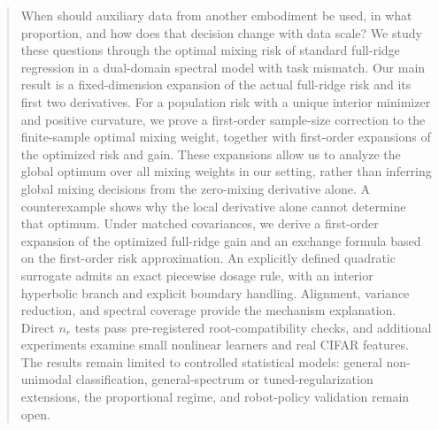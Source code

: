 \begin{abstract}
When should auxiliary data from another embodiment be used, in what proportion, and how does that decision change with data scale? We study these questions through the optimal mixing risk of standard full-ridge regression in a dual-domain spectral model with task mismatch.
Our main result is a fixed-dimension expansion of the actual full-ridge risk and its first two derivatives. For a population risk with a unique interior minimizer and positive curvature, we prove a first-order sample-size correction to the finite-sample optimal mixing weight, together with first-order expansions of the optimized risk and gain. These expansions allow us to analyze the global optimum over all mixing weights in our setting, rather than inferring global mixing decisions from the zero-mixing derivative alone. A counterexample shows why the local derivative alone cannot determine that optimum.
Under matched covariances, we derive a first-order expansion of the optimized full-ridge gain and an exchange formula based on the first-order risk approximation. An explicitly defined quadratic surrogate admits an exact piecewise dosage rule, with an interior hyperbolic branch and explicit boundary handling. Alignment, variance reduction, and spectral coverage provide the mechanism explanation. Direct $n_r$ tests pass pre-registered root-compatibility checks, and additional experiments examine small nonlinear learners and real CIFAR features. The results remain limited to controlled statistical models: general non-unimodal classification, general-spectrum or tuned-regularization extensions, the proportional regime, and robot-policy validation remain open.
\end{abstract}
